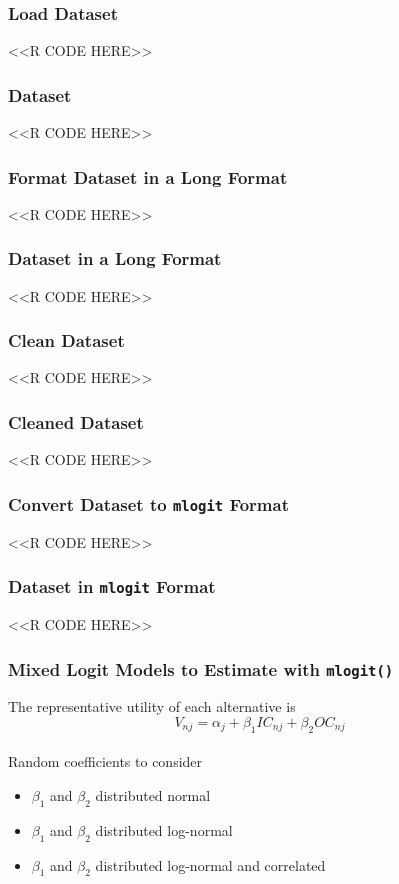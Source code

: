 \documentclass{beamer}
\begin{document}
\begin{frame}[fragile]\frametitle{Load Dataset}
    <<R CODE HERE>>
\end{frame}

\begin{frame}[fragile]\frametitle{Dataset}
    <<R CODE HERE>>
\end{frame}

\begin{frame}[fragile]\frametitle{Format Dataset in a Long Format}
    <<R CODE HERE>>
\end{frame}

\begin{frame}[fragile]\frametitle{Dataset in a Long Format}
    <<R CODE HERE>>
\end{frame}

\begin{frame}[fragile]\frametitle{Clean Dataset}
    <<R CODE HERE>>
\end{frame}

\begin{frame}[fragile]\frametitle{Cleaned Dataset}
    <<R CODE HERE>>
\end{frame}

\begin{frame}[fragile]\frametitle{Convert Dataset to \texttt{mlogit} Format}
    <<R CODE HERE>>
\end{frame}

\begin{frame}[fragile]\frametitle{Dataset in \texttt{mlogit} Format}
    <<R CODE HERE>>
\end{frame}

\begin{frame}\frametitle{Mixed Logit Models to Estimate with \texttt{mlogit()}}
    The representative utility of each alternative is
    $$V_{nj} = \alpha_j + \beta_1 IC_{nj} + \beta_2 OC_{nj}$$ \\
    \vspace{3ex}
    Random coefficients to consider
    \begin{itemize}
        \item $\beta_1$ and $\beta_2$ distributed normal
        \item $\beta_1$ and $\beta_2$ distributed log-normal
        \item $\beta_1$ and $\beta_2$ distributed log-normal and correlated
    \end{itemize}
\end{frame}
\end{document}

